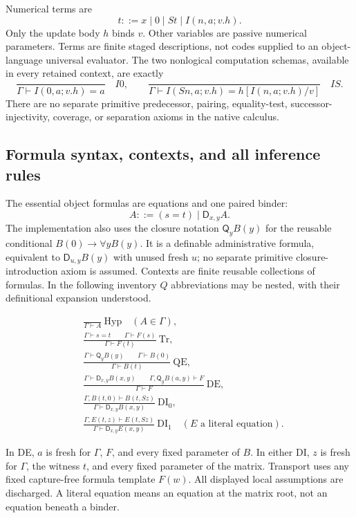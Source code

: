 \documentclass[11pt,letterpaper]{article}
\theoremstyle{definition}\newtheorem{definition}[theorem]{Definition}
\theoremstyle{remark}\newtheorem{remark}[theorem]{Remark}
\newcommand{\D}{\mathsf D}
\newcommand{\Q}{\mathsf Q}
\begin{document}
Numerical terms are
\[
 t::=x\mid 0\mid St\mid I(n,a;v.h).
\]
Only the update body $h$ binds $v$. Other variables are passive numerical
parameters. Terms are finite staged descriptions, not codes supplied to an
object-language universal evaluator. The two nonlogical computation schemas,
available in every retained context, are exactly
\[
 \frac{}{\Gamma\vdash I(0,a;v.h)=a}\quad I0,
 \qquad
 \frac{}{\Gamma\vdash I(Sn,a;v.h)=h[I(n,a;v.h)/v]}\quad IS.
\]
There are no separate primitive predecessor, pairing, equality-test,
successor-injectivity, coverage, or separation axioms in the native calculus.

\subsection{Formula syntax, contexts, and all inference rules}

The essential object formulas are equations and one paired binder:
\[
 A::=(s=t)\mid \D_{x,y}A.
\]
The implementation also uses the closure notation $\Q_yB(y)$ for the reusable
conditional $B(0)\to\forall yB(y)$. It is a definable administrative formula,
equivalent to $\D_{u,y}B(y)$ with unused fresh $u$; no separate primitive
closure-introduction axiom is assumed. Contexts are finite reusable collections
of formulas. In the following inventory $Q$ abbreviations may be nested, with
their definitional expansion understood.

\begin{align*}
 &\frac{}{\Gamma\vdash A}\ \mathrm{Hyp}\quad(A\in\Gamma),\\[4pt]
 &\frac{\Gamma\vdash s=t\qquad\Gamma\vdash F(s)}
        {\Gamma\vdash F(t)}\ \mathrm{Tr},\\[4pt]
 &\frac{\Gamma\vdash\Q_y B(y)\qquad\Gamma\vdash B(0)}
        {\Gamma\vdash B(t)}\ \mathrm{QE},\\[4pt]
 &\frac{\Gamma\vdash\D_{x,y}B(x,y)\qquad
         \Gamma,\Q_yB(a,y)\vdash F}
        {\Gamma\vdash F}\ \mathrm{DE},\\[4pt]
 &\frac{\Gamma,B(t,0)\vdash B(t,Sz)}
        {\Gamma\vdash\D_{x,y}B(x,y)}\ \mathrm{DI}_{0},\\[4pt]
 &\frac{\Gamma,E(t,z)\vdash E(t,Sz)}
        {\Gamma\vdash\D_{x,y}E(x,y)}\ \mathrm{DI}_{1}
        \quad(E\text{ a literal equation}).
\end{align*}

In DE, $a$ is fresh for $\Gamma$, $F$, and every fixed parameter of $B$.
In either DI, $z$ is fresh for $\Gamma$, the witness $t$, and every fixed
parameter of the matrix. Transport uses any fixed capture-free formula
template $F(w)$. All displayed local assumptions are discharged. A literal
equation means an equation at the matrix root, not an equation beneath a binder.
\end{document}
